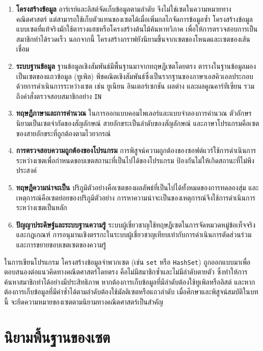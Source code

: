 \begin{enumerate}
    \item \textbf{โครงสร้างข้อมูล} อาร์เรย์และลิสต์จัดเก็บข้อมูลตามลำดับ จึงไม่ใช่เซตในความหมายทางคณิตศาสตร์ แต่สามารถใช้เก็บตัวแทนของเซตได้เมื่อเพิ่มกลไกจัดการข้อมูลซ้ำ โครงสร้างข้อมูลแบบเซตที่แท้จริงมักใช้ตารางแฮชหรือโครงสร้างต้นไม้ค้นหาทวิภาค เพื่อให้การตรวจสอบการเป็นสมาชิกทำได้รวดเร็ว นอกจากนี้ โครงสร้างกราฟยังนิยามขึ้นจากเซตของโหนดและเซตของเส้นเชื่อม
    \item \textbf{ระบบฐานข้อมูล} ฐานข้อมูลเชิงสัมพันธ์มีพื้นฐานมาจากทฤษฎีเซตโดยตรง ตารางในฐานข้อมูลมองเป็นเซตของแถวข้อมูล (ทูเพิล) พีชคณิตเชิงสัมพันธ์ซึ่งเป็นรากฐานของภาษาเอสคิวเอลประกอบด้วยการดำเนินการระหว่างเซต เช่น ยูเนียน อินเตอร์เซกชัน ผลต่าง และผลคูณคาร์ทีเซียน รวมถึงคำสั่งตรวจสอบสมาชิกอย่าง \texttt{IN}
    \item \textbf{ทฤษฎีภาษาและการคำนวณ} ในการออกแบบคอมไพเลอร์และแบบจำลองการคำนวณ ตัวอักษรนิยามเป็นเซตจำกัดของสัญลักษณ์ สายอักขระเป็นลำดับของสัญลักษณ์ และภาษาโปรแกรมคือเซตของสายอักขระที่ถูกต้องตามไวยากรณ์
    \item \textbf{การตรวจสอบความถูกต้องของโปรแกรม} การพิสูจน์ความถูกต้องของซอฟต์แวร์ใช้การดำเนินการระหว่างเซตเพื่อกำหนดขอบเขตสถานะที่เป็นไปได้ของโปรแกรม ป้องกันไม่ให้เกิดสถานะที่ไม่พึงประสงค์
    \item \textbf{ทฤษฎีความน่าจะเป็น} ปริภูมิตัวอย่างคือเซตของผลลัพธ์ที่เป็นไปได้ทั้งหมดของการทดลองสุ่ม และเหตุการณ์คือเซตย่อยของปริภูมิตัวอย่าง การหาความน่าจะเป็นของเหตุการณ์จึงใช้การดำเนินการระหว่างเซตเป็นหลัก
    \item \textbf{ปัญญาประดิษฐ์และระบบฐานความรู้} ระบบผู้เชี่ยวชาญใช้ทฤษฎีเซตในการจัดหมวดหมู่ข้อเท็จจริงและกฎเกณฑ์ การอนุมานเชิงตรรกะในระบบผู้เชี่ยวชาญเทียบเท่ากับการดำเนินการตัดส่วนร่วมและการขยายขอบเขตเซตของความรู้
\end{enumerate}

\begin{rem}
ในการเขียนโปรแกรม โครงสร้างข้อมูลจำพวกเซต (เช่น \texttt{set} หรือ \texttt{HashSet}) ถูกออกแบบมาเพื่อตอบสนองต่อแนวคิดทางคณิตศาสตร์โดยตรง คือไม่มีสมาชิกซ้ำและไม่มีลำดับตายตัว ซึ่งทำให้การค้นหาสมาชิกทำได้อย่างมีประสิทธิภาพ หากต้องการเก็บข้อมูลที่มีลำดับต้องใช้ทูเพิลหรือลิสต์ และหากต้องการเก็บข้อมูลที่มีค่าซ้ำได้ตามลำดับต้องใช้มัลติเซตหรือแถวลำดับ เมื่อศึกษาและพิสูจน์สมบัติในบทนี้ จะยึดความหมายของเซตตามนิยามทางคณิตศาสตร์เป็นสำคัญ
\label{rem:set-programming}
\end{rem}


\section{นิยามพื้นฐานของเซต}
\label{sec:set-basics}

